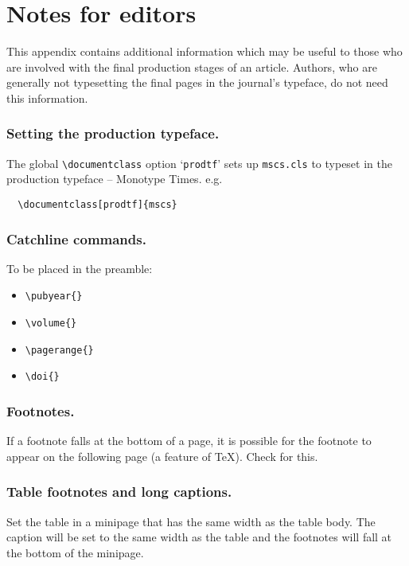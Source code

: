 \documentclass{mscs}
\begin{document}
\ifprodtf \else \newpage\fi
\section{Notes for editors}

\setcounter{subsubsection}{0}

This appendix contains additional information which may be useful to
those who are involved with the final production stages of an article.
Authors, who are generally not typesetting the final pages in the
journal's typeface, do not need this information.

\ifprodtf
\subsubsection{Setting the production typeface.}

The global \verb"\documentclass" option `\verb"prodtf"' sets up
\verb"mscs.cls" to typeset in the production typeface -- Monotype Times.
e.g.
%
\begin{verbatim}
  \documentclass[prodtf]{mscs}
\end{verbatim}
\fi

\subsubsection{Catchline commands.}

To be placed in the preamble:
\begin{itemize}
  \item \verb"\pubyear{}"
  \item \verb"\volume{}"
  \item \verb"\pagerange{}"
  \item \verb"\doi{}"
\end{itemize}

\subsubsection{Footnotes.}

If a footnote falls at the bottom of a page, it is possible for the
footnote to appear on the following page (a feature of \TeX ).
Check for this.

\subsubsection{Table footnotes and long captions.}

Set the table in a minipage that has the same width as the table body.
The caption will be set to the same width as the table and the footnotes
will fall at the bottom of the minipage.
\end{document}
